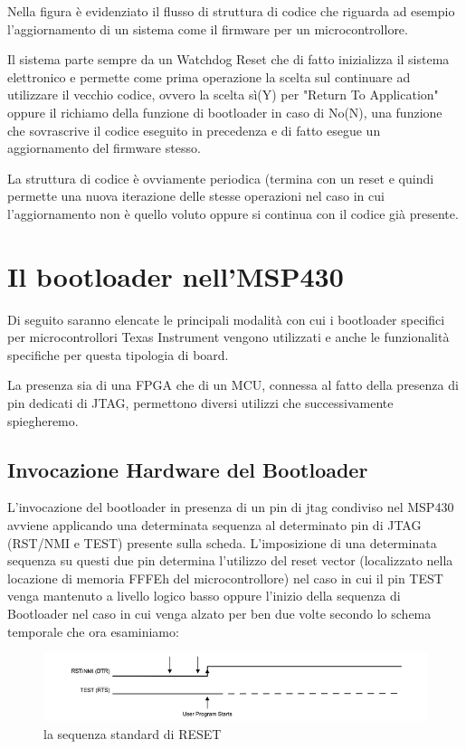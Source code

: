 \documentclass[LaM,binding=0.6cm,oneside]{../sapthesis}
\begin{document}
Nella figura è evidenziato il flusso di struttura di codice che riguarda ad esempio l'aggiornamento di un sistema come il firmware per un microcontrollore.

Il sistema parte sempre da un Watchdog Reset che di fatto inizializza il sistema
elettronico e permette come prima operazione la scelta sul continuare ad utilizzare il vecchio codice, ovvero la scelta sì(Y) per "Return To Application" oppure il richiamo della funzione di bootloader in caso di No(N), una funzione che sovrascrive il codice eseguito in precedenza e di fatto esegue un aggiornamento del firmware stesso.

La struttura di codice è ovviamente periodica (termina con un reset e quindi permette una nuova iterazione delle stesse operazioni nel caso in cui l'aggiornamento non è quello voluto oppure si continua con il codice già presente.



\section{Il bootloader nell'MSP430}
Di seguito saranno elencate le principali modalità con cui i bootloader specifici per microcontrollori Texas Instrument vengono utilizzati e anche le funzionalità specifiche per questa tipologia di board.

La presenza sia di una FPGA che di un MCU, connessa al fatto della presenza di pin dedicati di JTAG, permettono diversi utilizzi che successivamente spiegheremo.
\subsection{Invocazione Hardware del Bootloader}

L’invocazione del bootloader in presenza di un pin di jtag condiviso nel MSP430 avviene applicando una determinata sequenza al determinato pin di JTAG (RST/NMI e TEST) presente sulla scheda.
L’imposizione di una determinata sequenza su questi due pin determina l’utilizzo del reset vector (localizzato nella locazione di memoria FFFEh del microcontrollore) nel caso in cui il pin TEST venga mantenuto a livello logico basso oppure l’inizio della sequenza di Bootloader nel caso in cui venga alzato per ben due volte secondo lo schema temporale che ora esaminiamo:

\begin{figure}[htbp]
\centerline{\includegraphics[scale=.7]{examples/resetSequence.PNG}}
\caption{la sequenza standard di RESET}
\label{fig}
\end{figure}
\end{document}
